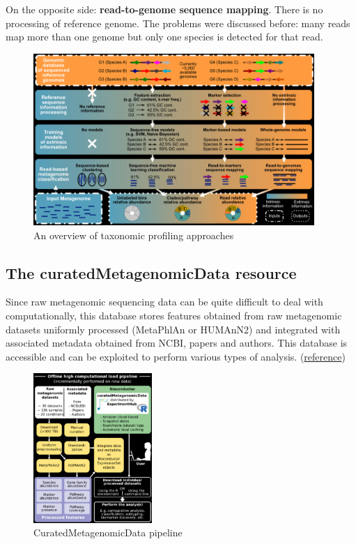 On the opposite side: \textbf{read-to-genome sequence mapping}. There is no processing of reference genome. The problems were discussed before: many reads map more than one genome but only one species is detected for that read.

\begin{figure}[!h]
\centering
\includegraphics[width=0.95\textwidth]{taxApproaches.png}
\caption{\label{fig:taxApproaches}An overview of taxonomic profiling approaches}
\end{figure}

\vspace{3cm}

\subsection{The curatedMetagenomicData resource}

Since raw metagenomic sequencing data can be quite difficult to deal with computationally, this database stores features obtained from raw metagenomic datasets uniformly processed (MetaPhlAn or HUMAnN2) and integrated with associated metadata obtained from NCBI, papers and authors. This database is accessible and can be exploited to perform various types of analysis. (\href{https://bioconductor.org/packages/release/data/experiment/html/curatedMetagenomicData.html}{reference})

\begin{figure}[!h]
\centering
\includegraphics[width=0.4\textwidth]{curatedMetagenomicData.png}
\caption{\label{fig:curatedMetagenomicData}CuratedMetagenomicData pipeline}
\end{figure}

